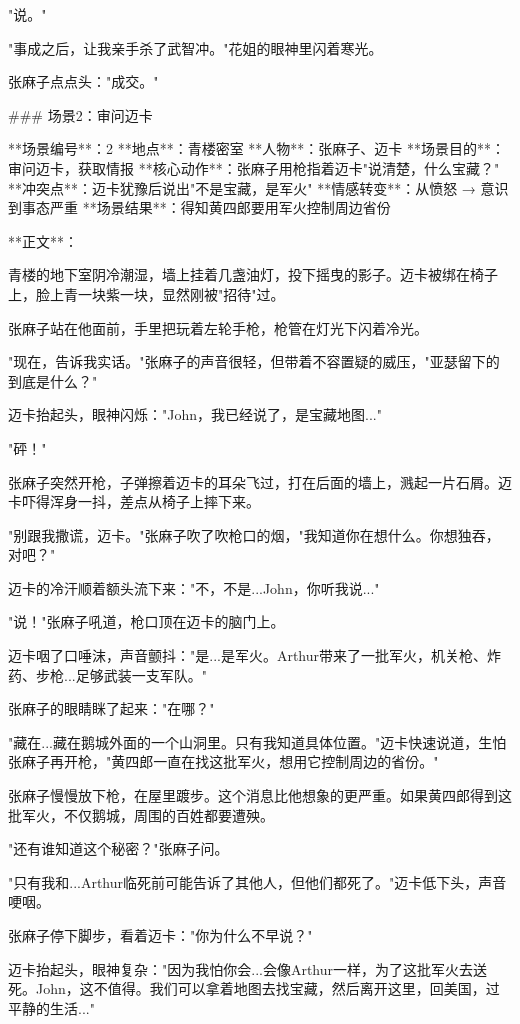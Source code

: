 "说。"

"事成之后，让我亲手杀了武智冲。"花姐的眼神里闪着寒光。

张麻子点点头："成交。"

### 场景2：审问迈卡

**场景编号**：2  
**地点**：青楼密室  
**人物**：张麻子、迈卡  
**场景目的**：审问迈卡，获取情报  
**核心动作**：张麻子用枪指着迈卡"说清楚，什么宝藏？"  
**冲突点**：迈卡犹豫后说出"不是宝藏，是军火"  
**情感转变**：从愤怒 → 意识到事态严重  
**场景结果**：得知黄四郎要用军火控制周边省份

**正文**：

青楼的地下室阴冷潮湿，墙上挂着几盏油灯，投下摇曳的影子。迈卡被绑在椅子上，脸上青一块紫一块，显然刚被"招待"过。

张麻子站在他面前，手里把玩着左轮手枪，枪管在灯光下闪着冷光。

"现在，告诉我实话。"张麻子的声音很轻，但带着不容置疑的威压，"亚瑟留下的到底是什么？"

迈卡抬起头，眼神闪烁："John，我已经说了，是宝藏地图..."

"砰！"

张麻子突然开枪，子弹擦着迈卡的耳朵飞过，打在后面的墙上，溅起一片石屑。迈卡吓得浑身一抖，差点从椅子上摔下来。

"别跟我撒谎，迈卡。"张麻子吹了吹枪口的烟，"我知道你在想什么。你想独吞，对吧？"

迈卡的冷汗顺着额头流下来："不，不是...John，你听我说..."

"说！"张麻子吼道，枪口顶在迈卡的脑门上。

迈卡咽了口唾沫，声音颤抖："是...是军火。Arthur带来了一批军火，机关枪、炸药、步枪...足够武装一支军队。"

张麻子的眼睛眯了起来："在哪？"

"藏在...藏在鹅城外面的一个山洞里。只有我知道具体位置。"迈卡快速说道，生怕张麻子再开枪，"黄四郎一直在找这批军火，想用它控制周边的省份。"

张麻子慢慢放下枪，在屋里踱步。这个消息比他想象的更严重。如果黄四郎得到这批军火，不仅鹅城，周围的百姓都要遭殃。

"还有谁知道这个秘密？"张麻子问。

"只有我和...Arthur临死前可能告诉了其他人，但他们都死了。"迈卡低下头，声音哽咽。

张麻子停下脚步，看着迈卡："你为什么不早说？"

迈卡抬起头，眼神复杂："因为我怕你会...会像Arthur一样，为了这批军火去送死。John，这不值得。我们可以拿着地图去找宝藏，然后离开这里，回美国，过平静的生活..."


